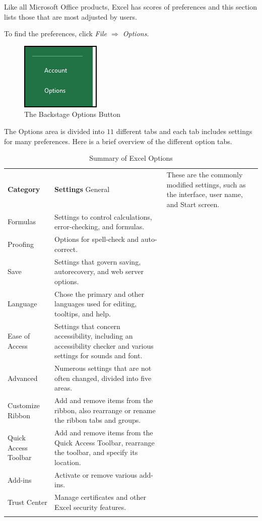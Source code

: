 Like all Microsoft Office products, Excel has scores of preferences and this section lists those that are most adjusted by users.

To find the preferences, click \textit{File $ \Rightarrow $ Options}.

\begin{figure}[H]
	\centering
	\includegraphics[width=\maxwidth{.95\linewidth}]{gfx/ch09_fig50}
	\caption{The Backstage Options Button}
	\label{09:fig68}
\end{figure}
 
The Options area is divided into $ 11 $ different tabs and each tab includes settings for many preferences. Here is a brief overview of the different option tabs.

\begin{table}[H]
	{\small
		\begin{longtable}{L{1.00in}L{3.00in}} %
			\textbf{Category} & \textbf{Settings} \endhead
			\hline
			General & These are the commonly modified settings, such as the interface, user name, and Start screen.\\
			Formulas & Settings to control calculations, error-checking, and formulas.\\
			Proofing & Options for spell-check and auto-correct.\\
			Save & Settings that govern saving, autorecovery, and web server options.\\
			Language & Chose the primary and other languages used for editing, tooltips, and help.\\
			Ease of Access & Settings that concern accessibility, including an accessibility checker and various settings for sounds and font.\\
			Advanced & Numerous settings that are not often changed, divided into five areas.\\
			Customize Ribbon & Add and remove items from the ribbon, also rearrange or rename the ribbon tabs and groups.\\
			Quick Access Toolbar & Add and remove items from the Quick Access Toolbar, rearrange the toolbar, and specify its location.\\
			Add-ins & Activate or remove various add-ins.\\
			Trust Center & Manage certificates and other Excel security features.\\
			\caption{Summary of Excel Options}
			\label{09:tab03}
		\end{longtable}
	} %
\end{table}

